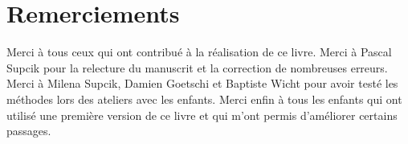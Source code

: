 \chapter*{Remerciements}

Merci à tous ceux qui ont contribué à la réalisation de ce livre. Merci à Pascal Supcik pour la relecture du manuscrit et la correction de nombreuses erreurs. Merci à Milena Supcik, Damien Goetschi et Baptiste Wicht pour avoir testé les méthodes lors des ateliers avec les enfants. Merci enfin à tous les enfants qui ont utilisé une première version de ce livre et qui m'ont permis d'améliorer certains passages.